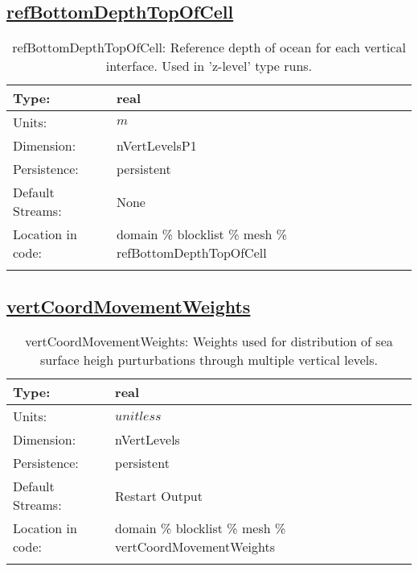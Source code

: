 \subsection[refBottomDepthTopOfCell]{\hyperref[sec:var_tab_mesh]{refBottomDepthTopOfCell}}
\label{subsec:var_sec_mesh_refBottomDepthTopOfCell}
\begin{center}
\begin{longtable}{| p{2.0in} | p{4.0in} |}
        \hline 
        Type: & real \\
        \hline 
        Units: & $m$ \\
        \hline 
        Dimension: & nVertLevelsP1 \\
        \hline 
        Persistence: & persistent \\
        \hline 
		 Default Streams: & None \\
        \hline 
		 Location in code: & domain \% blocklist \% mesh \% refBottomDepthTopOfCell \\
		 \hline 
    \caption{refBottomDepthTopOfCell: Reference depth of ocean for each vertical interface. Used in 'z-level' type runs.}
\end{longtable}
\end{center}
\subsection[vertCoordMovementWeights]{\hyperref[sec:var_tab_mesh]{vertCoordMovementWeights}}
\label{subsec:var_sec_mesh_vertCoordMovementWeights}
\begin{center}
\begin{longtable}{| p{2.0in} | p{4.0in} |}
        \hline 
        Type: & real \\
        \hline 
        Units: & $unitless$ \\
        \hline 
        Dimension: & nVertLevels \\
        \hline 
        Persistence: & persistent \\
        \hline 
		 Default Streams: & Restart Output  \\
        \hline 
		 Location in code: & domain \% blocklist \% mesh \% vertCoordMovementWeights \\
		 \hline 
    \caption{vertCoordMovementWeights: Weights used for distribution of sea surface heigh purturbations through multiple vertical levels.}
\end{longtable}
\end{center}
